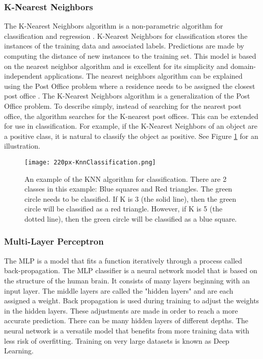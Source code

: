 \subsubsection{K-Nearest Neighbors}
The K-Nearest Neighbors algorithm is a non-parametric algorithm for classification and regression \cite{altman1992introduction}.
K-Nearest Neighbors for classification stores the instances of the training data and associated labels.
Predictions are made by computing the distance of new instances to the training set.
This model is based on the nearest neighbor algorithm and is excellent for its simplicity and domain-independent applications.
The nearest neighbors algorithm can be explained using the Post Office problem where a residence needs to be assigned the closest post office \cite{knuth1997art}.
The K-Nearest Neighbors algorithm is a generalization of the Post Office problem.
To describe simply, instead of searching for the nearest post office, the algorithm searches for the K-nearest post offices.
This can be extended for use in classification.
For example, if the K-Nearest Neighbors of an object are a positive class, it is natural to classify the object as positive.
See Figure \ref{fig:knn} for an illustration.

\begin{figure}[htp]
    \centering
    \texttt{[image: 220px-KnnClassification.png]}
    \caption{An example of the KNN algorithm for classification.
    There are 2 classes in this example: Blue squares and Red triangles.
    The green circle needs to be classified.
    If K is 3 (the solid line), then the green circle will be classified as a red triangle.
    However, if K is 5 (the dotted line), then the green circle will be classified as a blue square.}
    \label{fig:knn}
\end{figure} 

\medskip

\subsubsection{Multi-Layer Perceptron}
The \ac{MLP} is a model that fits a function iteratively through a process called back-propagation.
The MLP classifier is a neural network model that is based on the structure of the human brain.
It consists of many layers beginning with an input layer.
The middle layers are called the "hidden layers" and are each assigned a weight.
Back propagation is used during training to adjust the weights in the hidden layers.
These adjustments are made in order to reach a more accurate prediction.
There can be many hidden layers of different depths.
The neural network is a versatile model that benefits from more training data with less risk of overfitting.
Training on very large datasets is known as Deep Learning.

